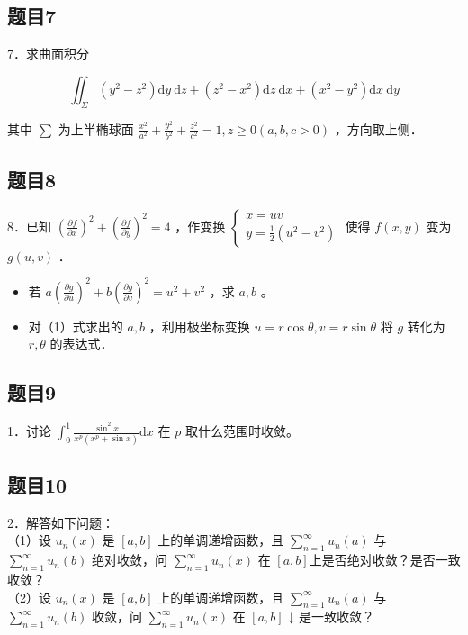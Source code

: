 \documentclass{article}
\begin{document}
\subsection{题目7}
7．求曲面积分

\[
\iint_{\Sigma}\left(y^{2}-z^{2}\right) \mathrm{d} y \mathrm{~d} z+\left(z^{2}-x^{2}\right) \mathrm{d} z \mathrm{~d} x+\left(x^{2}-y^{2}\right) \mathrm{d} x \mathrm{~d} y
\]

其中 \(\sum\) 为上半椭球面 \(\frac{x^{2}}{a^{2}}+\frac{y^{2}}{b^{2}}+\frac{z^{2}}{c^{2}}=1, z \geq 0(a, b, c>0)\) ，方向取上侧．

\subsection{题目8}
8．已知 \(\left(\frac{\partial f}{\partial x}\right)^{2}+\left(\frac{\partial f}{\partial y}\right)^{2}=4\) ，作变换 \(\left\{\begin{array}{l}x=u v \\ y=\frac{1}{2}\left(u^{2}-v^{2}\right)\end{array}\right.\) 使得 \(f(x, y)\) 变为 \(g(u, v)\) ．

\begin{itemize}
  \item[（1）] 若 \(a\left(\frac{\partial g}{\partial u}\right)^{2}+b\left(\frac{\partial g}{\partial v}\right)^{2}=u^{2}+v^{2}\) ，求 \(a, b\) 。
  \item[（2）] 对（1）式求出的 \(a, b\) ，利用极坐标变换 \(u=r \cos \theta, v=r \sin \theta\) 将 \(g\) 转化为 \(r, \theta\) 的表达式．
\end{itemize}

\subsection{题目9}
1．讨论 \(\int_{0}^{1} \frac{\sin ^{2} x}{x^{p}\left(x^{p}+\sin x\right)} \mathrm{d} x\) 在 \(p\) 取什么范围时收敛。

\subsection{题目10}
2．解答如下问题：\\
（1）设 \(u_{n}(x)\) 是 \([a, b]\) 上的单调递增函数，且 \(\sum_{n=1}^{\infty} u_{n}(a)\) 与 \(\sum_{n=1}^{\infty} u_{n}(b)\) 绝对收敛，问 \(\sum_{n=1}^{\infty} u_{n}(x)\) 在 \([a, b]\)上是否绝对收敛？是否一致收敛？\\
（2）设 \(u_{n}(x)\) 是 \([a, b]\) 上的单调递增函数，且 \(\sum_{n=1}^{\infty} u_{n}(a)\) 与 \(\sum_{n=1}^{\infty} u_{n}(b)\) 收敛，问 \(\sum_{n=1}^{\infty} u_{n}(x)\) 在 \([a, b]\) ↓ 是一致收敛？
\end{document}

